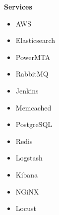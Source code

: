 \documentclass[9pt]{developercv} %
\begin{document}
\begin{minipage}[t]{0.3\textwidth}
  \vspace{-\baselineskip}

  \textbf{Services}
  \begin{itemize}
      \item AWS
      \item Elasticsearch
      \item PowerMTA
      \item RabbitMQ
      \item Jenkins
      \item Memcached
      \item PostgreSQL
      \item Redis
      \item Logstash
      \item Kibana
      \item NGiNX
      \item Locust
  \end{itemize}
\end{minipage}

\end{document}
